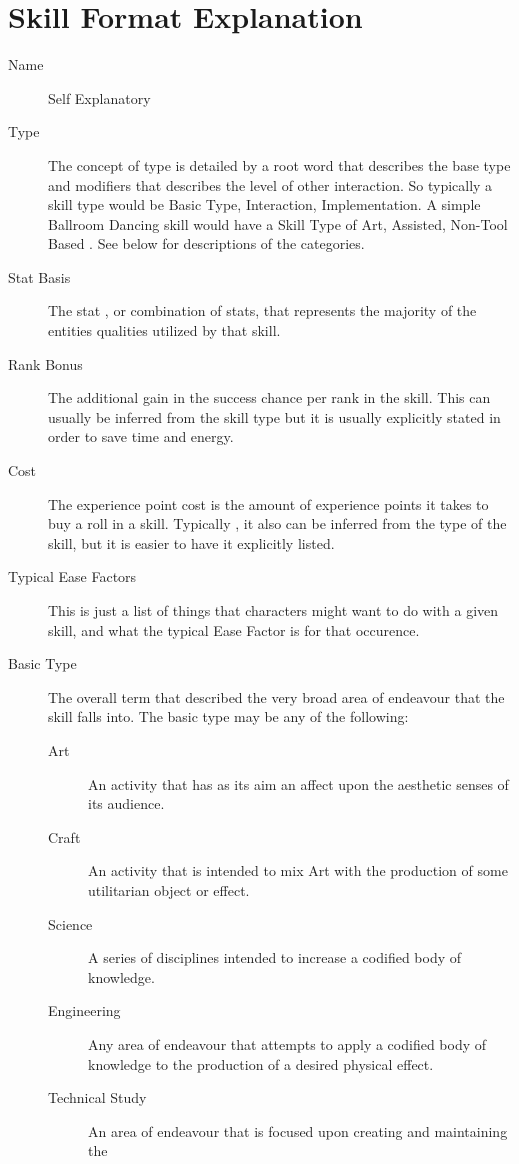 \section{Skill Format Explanation}
\begin{description}
	\item[Name]
	Self Explanatory
	\item[Type]
	The concept of type is detailed by a root word that describes the base
	type and modifiers that describes the level of other interaction. So
	typically a skill type would be Basic Type, Interaction, Implementation.
	A simple Ballroom Dancing skill would have a Skill Type of
	Art, Assisted, Non-Tool Based . See below for descriptions of the
	categories.
	\item[Stat Basis]
	The stat , or combination of stats, that represents the majority of the
	entities qualities utilized by that skill.
	\item[Rank Bonus]
	The additional gain in the success chance per rank in the skill. This can
	usually be inferred from the skill type but it is usually explicitly
	stated in order to save time and energy.
	\item[Cost]
	The experience point cost is the amount of experience points it takes to
	buy a roll in a skill. Typically , it also can be inferred from the type
	of the skill, but it is easier to have it explicitly listed.
	\item[Typical Ease Factors]
	This is just a list of things that characters might want to do with a
	given skill, and what the typical Ease Factor is for that occurence.
	\item[Basic Type]
	The overall term that described the very broad area of
	endeavour that the skill falls into. The basic type may be any of the 
	following:
	\begin{description}
		\item[Art ]
		An activity that has as its aim an affect upon the aesthetic senses of its
		audience.
		\item[Craft]
		An activity that is intended to mix Art with the production of some
		utilitarian object or effect.
		\item[Science]
		A series of disciplines intended to increase a codified body of
		knowledge.
		\item[Engineering]
		Any area of endeavour that attempts to apply a codified body of
		knowledge to the production of a desired physical effect.
		\item[Technical Study]
		An area of endeavour that is focused upon creating and maintaining the

\end{description}
\end{description}
